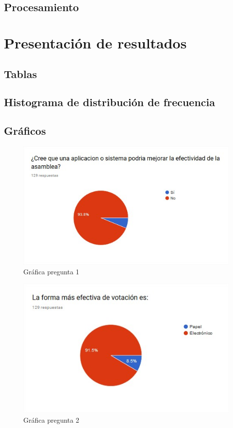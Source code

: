 \subsection{Procesamiento}



\section{Presentación de resultados}

\subsection{Tablas}

\subsection{Histograma de distribución de frecuencia}

\subsection{Gráficos}


\begin{figure}[th!]
	\centering
	\includegraphics[width=0.7\linewidth]{desarrollo/resultados/imgs/pregunta-1}
	\caption{Gráfica pregunta 1}
\end{figure}


\begin{figure}[th!]
	\centering
	\includegraphics[width=0.7\linewidth]{desarrollo/resultados/imgs/pregunta-2}
	\caption{Gráfica pregunta 2}
\end{figure}

